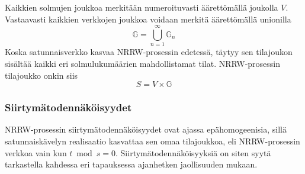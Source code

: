 \documentclass[finnish, 12pt, a4paper, sci, utf8, pdfa]{aaltothesis}
\begin{document}
Kaikkien solmujen joukkoa merkitään numeroituvasti äärettömällä joukolla $ V $. Vastaavasti kaikkien verkkojen joukkoa voidaan merkitä äärettömällä unionilla
\begin{equation}
   \mathbb{G} = \bigcup_{n = 1}^{\infty} \mathbb{G}_{n}
\end{equation}
Koska satunnaisverkko kasvaa NRRW-prosessin edetessä, täytyy sen tilajoukon sisältää kaikki eri solmulukumäärien mahdollistamat tilat. NRRW-prosessin tilajoukko onkin siis
\begin{equation}
   S = V \times \mathbb{G}
   \label{equation:tilajoukko}
\end{equation}

\subsubsection{Siirtymätodennäköisyydet}

NRRW-prosessin siirtymätodennäköisyydet ovat ajassa epähomogeenisia, sillä satunnaiskävelyn realisaatio kasvattaa sen omaa tilajoukkoa, eli NRRW-prosessin verkkoa vain kun $ t \bmod s = 0 $. Siirtymätodennäköisyyksiä on siten syytä tarkastella kahdessa eri tapauksessa ajanhetken jaollisuuden mukaan. 
\end{document}
